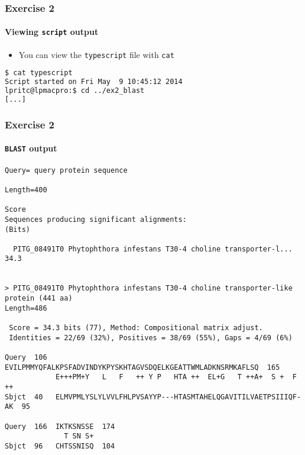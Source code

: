 \begin{frame}[fragile]
  \frametitle{Exercise 2}
  \framesubtitle{Viewing \texttt{script} output}
  \begin{itemize}
    \item You can view the \texttt{typescript} file with \texttt{cat}
  \end{itemize}
\begin{lstlisting}[language=bash]
$ cat typescript
Script started on Fri May  9 10:45:12 2014
lpritc@lpmacpro:$ cd ../ex2_blast
[...]
\end{lstlisting}    
\end{frame}

\begin{frame}[fragile]
  \frametitle{Exercise 2}
  \framesubtitle{\texttt{BLAST} output}
  \begin{tiny}
  \begin{verbatim}
Query= query protein sequence

Length=400
                                                                      Score
Sequences producing significant alignments:                          (Bits)

  PITG_08491T0 Phytophthora infestans T30-4 choline transporter-l...  34.3


> PITG_08491T0 Phytophthora infestans T30-4 choline transporter-like 
protein (441 aa)
Length=486

 Score = 34.3 bits (77), Method: Compositional matrix adjust.
 Identities = 22/69 (32%), Positives = 38/69 (55%), Gaps = 4/69 (6%)

Query  106  EVILPMMYQFALKPSFADVINDYKPYSKHTAGVSDQELKGEATTWMLADKNSRMKAFLSQ  165
            E+++PM+Y   L   F   ++ Y P   HTA ++  EL+G   T ++A+  S +  F ++
Sbjct  40   ELMVPMLYSLYLVVLFHLPVSAYYP---HTASMTAHELQGAVITILVAETPSIIIQF-AK  95

Query  166  IKTKSNSSE  174
              T SN S+
Sbjct  96   CHTSSNISQ  104
  \end{verbatim}   
  \end{tiny} 
\end{frame}

